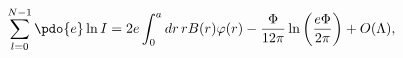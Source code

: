 \begin{equation}
\label{Eq_A28}
\sum^{N-1}_{l=0} \pdo{e} \ln I
  = 2e \int^{a}_0 dr \, r B(r) \varphi(r)
    - \frac{\Phi}{12\pi} \ln \left(\frac{e\Phi}{2\pi}\right)
    + O(\Lambda),
\end{equation}

